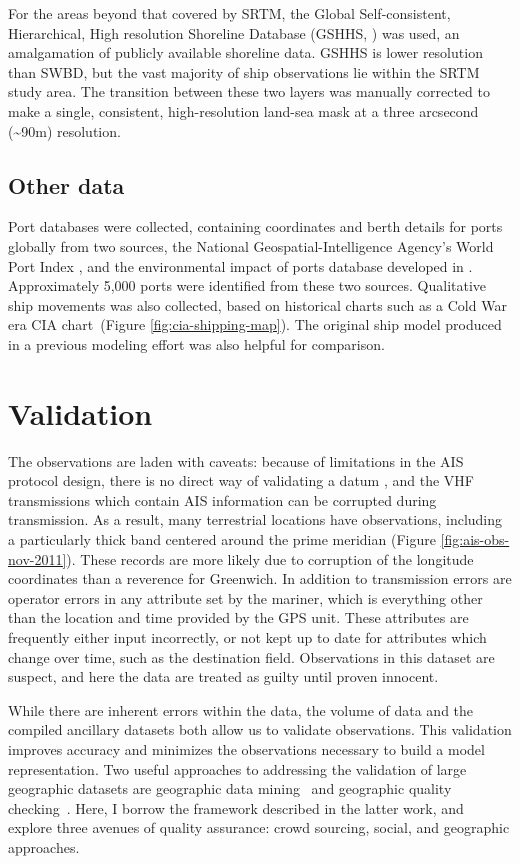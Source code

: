 For the areas beyond that covered by SRTM, the Global Self-consistent, Hierarchical, High resolution Shoreline Database (GSHHS, \citealp{wessel1996global}) was used, an amalgamation of publicly available shoreline data. GSHHS is lower resolution than SWBD, but the vast majority of ship observations lie within the SRTM study area. The transition between these two layers was manually corrected to make a single, consistent, high-resolution land-sea mask at a three arcsecond (\textasciitilde{}90m) resolution.

\subsection{Other data}
Port databases were collected, containing coordinates and berth details for ports globally from two sources, the National Geospatial-Intelligence Agency's World Port Index \citep{worldportindex}, and the environmental impact of ports database developed in \cite{Halpern2008}. Approximately 5,000 ports were identified from these two sources.  Qualitative ship movements was also collected, based on historical charts such as a Cold War era CIA chart~(Figure \ref{fig:cia-shipping-map}). The original ship model produced in a previous modeling effort \citep{Halpern2008} was also helpful for comparison.

\section{Validation}
The observations are laden with caveats: because of limitations in the AIS protocol design, there is no direct way of validating a datum \citep{RaymondInPress}, and the VHF transmissions which contain AIS information can be corrupted during transmission. As a result, many terrestrial locations have observations, including a particularly thick band centered around the prime meridian (Figure \ref{fig:ais-obs-nov-2011}). These records are more likely due to corruption of the longitude coordinates than a reverence for Greenwich. In addition to transmission errors are operator errors in any attribute set by the mariner, which is everything other than the location and time provided by the GPS unit. These attributes are frequently either input incorrectly, or not kept up to date for attributes which change over time, such as the destination field. Observations in this dataset are suspect, and here the data are treated as guilty until proven innocent.

While there are inherent errors within the data, the volume of data and the compiled ancillary datasets both allow us to validate observations. This validation improves accuracy and minimizes the observations necessary to build a model representation. Two useful approaches to addressing the validation of large geographic datasets are geographic data mining~\citep{miller2009geographic} and geographic quality checking~\cite{goodchildli2012}. Here, I borrow the framework described in the latter work, and explore three avenues of quality assurance: crowd sourcing, social, and geographic approaches.

